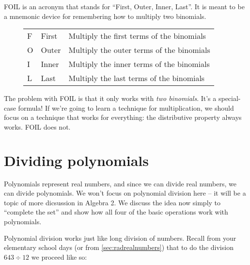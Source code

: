FOIL is an acronym that stands for ``First, Outer, Inner, Last''. It is meant to be a mnemonic device for remembering how to multiply two binomials.

\begin{figure}
\begin{tabular}{lll}
F & First & Multiply the first terms of the binomials\\
O & Outer & Multiply the outer terms of the binomials\\
I & Inner & Multiply the inner terms of the binomials\\
L & Last & Multiply the last terms of the binomials
\end{tabular}

\vspace{3ex}

\end{figure}

The problem with FOIL is that it only works with \textit{two binomials}. It's a special-case formula! If we're going to learn a technique for multiplication, we should focus on a technique that works for everything: the distributive property always works. FOIL does not.

\section{Dividing polynomials}

Polynomials represent real numbers, and since we can divide real numbers, we can divide polynomials. We won't focus on polynomial division here -- it will be a topic of more dicsussion in Algebra 2. We discuss the idea now simply to ``complete the set'' and show how all four of the basic operations work with polynomials.

Polynomial division works just like long division of numbers. Recall from your elementary school days (or from \cref{sec:radrealnumbers}) that to do the division $643\div12$ we proceed like so:


